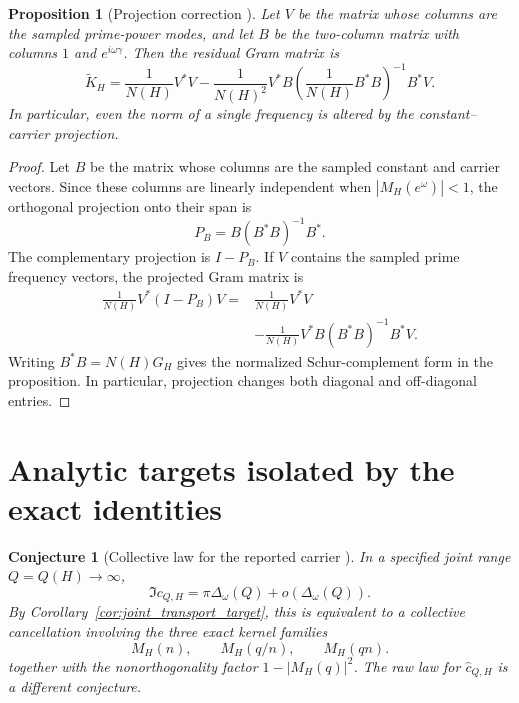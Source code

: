 \documentclass[11pt]{amsart}
\numberwithin{equation}{section}
\theoremstyle{plain}
\newtheorem{proposition}[theorem]{Proposition}
\newtheorem{conjecture}[theorem]{Conjecture}
\theoremstyle{definition}
\theoremstyle{remark}
\newcommand{\1}{\mathbf{1}}
\begin{document}
\begin{proposition}[Projection correction {}]
\label{prop:projection_correction_detailed}
Let $V$ be the matrix whose columns are the sampled prime-power modes, and
let $B$ be the two-column matrix with columns $1$ and $e^{i\omega\gamma}$.
Then the residual Gram matrix is
\begin{equation}
\widetilde K_H
=
\frac1{N(H)}V^\ast V
-
\frac1{N(H)^2}
V^\ast B
\left(\frac1{N(H)}B^\ast B\right)^{-1}
B^\ast V.
\label{eq:matrix_schur_projection}
\end{equation}
In particular, even the norm of a single frequency is altered by the
constant--carrier projection.
\end{proposition}

\begin{proof}
Let \(B\) be the matrix whose columns are the sampled constant and carrier
vectors.  Since these columns are linearly independent when
\(|M_H(e^\omega)|<1\), the orthogonal projection onto their span is
\begin{equation}
P_B=B(B^\ast B)^{-1}B^\ast.
\label{eq:projection_PB_detailed}
\end{equation}
The complementary projection is \(I-P_B\).  If \(V\) contains the sampled
prime frequency vectors, the projected Gram matrix is
\begin{align}
\frac1{N(H)}V^\ast(I-P_B)V
={}&
\frac1{N(H)}V^\ast V
\label{eq:projection_gram_one}
\\
&-
\frac1{N(H)}V^\ast B(B^\ast B)^{-1}B^\ast V.
\label{eq:projection_gram_two}
\end{align}
Writing \(B^\ast B=N(H)G_H\) gives the normalized Schur-complement form in
the proposition.  In particular, projection changes both diagonal and
off-diagonal entries.
\end{proof}

\section{Analytic targets isolated by the exact identities}
\label{sec:analytic_targets}

\begin{conjecture}[Collective law for the reported carrier {\normalfont[Conjecture]}]
\label{conj:collective_carrier_law}
In a specified joint range \(Q=Q(H)\to\infty\),
\begin{equation}
\Im c_{Q,H}
=
\pi\Delta_\omega(Q)
+
o\left(\Delta_\omega(Q)\right).
\label{eq:collective_carrier_law}
\end{equation}
By Corollary~\ref{cor:joint_transport_target}, this is equivalent to a
collective cancellation involving the three exact kernel families
\begin{equation}
M_H(n),\qquad M_H(q/n),\qquad M_H(qn).
\label{eq:three_joint_kernel_families}
\end{equation}
together with the nonorthogonality factor
\(1-|M_H(q)|^2\).  The raw law for \(\widehat c_{Q,H}\) is a different
conjecture.
\end{conjecture}
\end{document}

